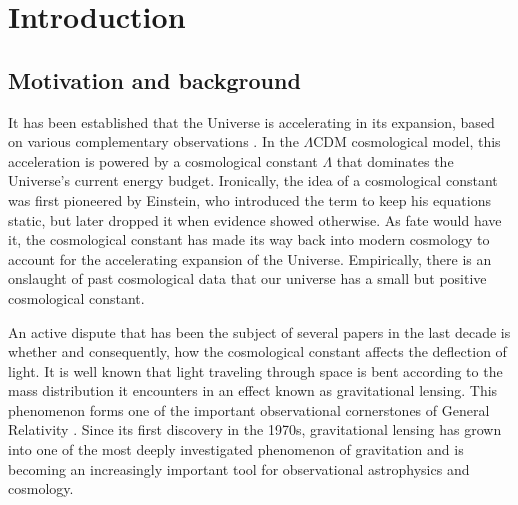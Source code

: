 \chapter{Introduction}


\section{Motivation and background}

It has been established that the Universe is accelerating in its expansion, based on various complementary observations \citep{riess2004type,spergel2003first}. In the $\Lambda \text{CDM}$ cosmological model, this acceleration is powered by a cosmological constant $\Lambda$ that dominates the Universe's current energy budget. Ironically, the idea of a cosmological constant was first pioneered by Einstein, who introduced the term to keep his equations static, but later dropped it when evidence showed otherwise. As fate would have it, the cosmological constant has made its way back into modern cosmology to account for the accelerating expansion of the Universe. Empirically, there is an onslaught of past cosmological data \citet{carmeli2001value,de2000flat,peebles2003cosmological} that our universe has a small but positive cosmological constant. 

An active dispute that has been the subject of several papers in the last decade is whether and consequently, how the cosmological constant affects the deflection of light. It is well known that light traveling through space is bent according to the mass distribution it encounters in an effect known as gravitational lensing. This phenomenon forms one of the important observational cornerstones of General Relativity \citep{will1993theory}. Since its first discovery in the 1970s, gravitational lensing has grown into one of the most deeply investigated phenomenon of gravitation and is becoming an increasingly important tool for observational astrophysics and cosmology. 

